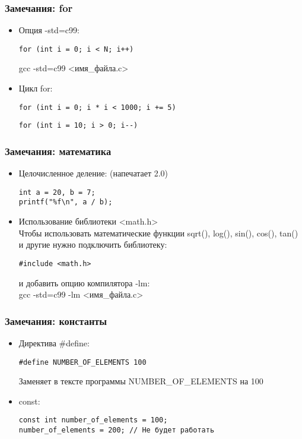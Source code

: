 \documentclass[12pt,pdf,hyperref={unicode}]{beamer}
\begin{document}
\begin{frame}[fragile]
\frametitle{Замечания: for}
\begin{itemize}
\item Опция -std=c99:
\begin{lstlisting}
for (int i = 0; i < N; i++)
\end{lstlisting}
gcc -std=c99 <имя\_файла.c>
\item Цикл for:
\begin{lstlisting}
for (int i = 0; i * i < 1000; i += 5)
\end{lstlisting}
\begin{lstlisting}
for (int i = 10; i > 0; i--)
\end{lstlisting}
\end{itemize}
\end{frame}

\begin{frame}[fragile]
\frametitle{Замечания: математика}
\begin{itemize}
\item Целочисленное деление: (напечатает 2.0)
\begin{lstlisting}
int a = 20, b = 7;
printf("%f\n", a / b); 
\end{lstlisting}
\item Использование библиотеки <math.h>\\
Чтобы использовать математические функции sqrt(), log(), sin(), cos(), tan() и другие нужно подключить
библиотеку: 
\begin{verbatim}
#include <math.h>
\end{verbatim}
и добавить опцию компилятора -lm: \\
gcc -std=c99 -lm <имя\_файла.c>
\end{itemize}
\end{frame}

\begin{frame}[fragile]
\frametitle{Замечания: константы}
\begin{itemize}
\item Директива \#define:
\begin{verbatim}
#define NUMBER_OF_ELEMENTS 100
\end{verbatim}
Заменяет в тексте программы  NUMBER\_OF\_ELEMENTS на 100
\item const:
\begin{verbatim}
const int number_of_elements = 100;
number_of_elements = 200; // Не будет работать
\end{verbatim}
\end{itemize}
\end{frame}
\end{document}
